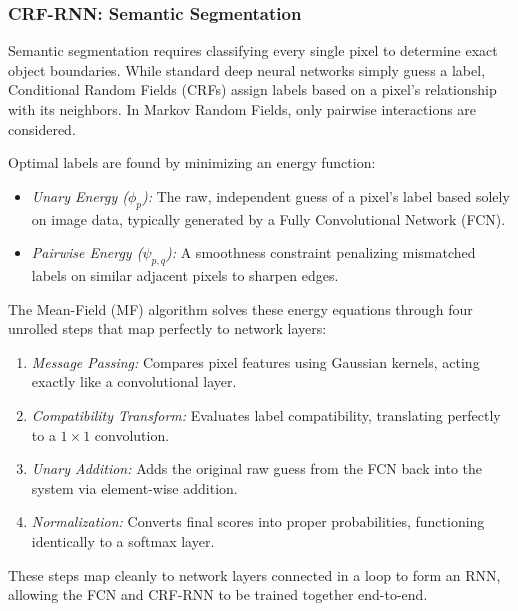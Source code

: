 \documentclass[conference]{IEEEtran}
\begin{document}
\subsubsection{CRF-RNN: Semantic Segmentation}
Semantic segmentation requires classifying every single pixel to determine exact object boundaries. While standard deep neural networks simply guess a label, Conditional Random Fields (CRFs) assign labels based on a pixel's relationship with its neighbors. In Markov Random Fields, only pairwise interactions are considered.

Optimal labels are found by minimizing an energy function:
\begin{itemize}
    \item \textit{Unary Energy ($\phi_p$):} The raw, independent guess of a pixel's label based solely on image data, typically generated by a Fully Convolutional Network (FCN).
    \item \textit{Pairwise Energy ($\psi_{p,q}$):} A smoothness constraint penalizing mismatched labels on similar adjacent pixels to sharpen edges.
\end{itemize}

The Mean-Field (MF) algorithm solves these energy equations through four unrolled steps that map perfectly to network layers:
\begin{enumerate}
    \item \textit{Message Passing:} Compares pixel features using Gaussian kernels, acting exactly like a convolutional layer.
    \item \textit{Compatibility Transform:} Evaluates label compatibility, translating perfectly to a $1 \times 1$ convolution.
    \item \textit{Unary Addition:} Adds the original raw guess from the FCN back into the system via element-wise addition.
    \item \textit{Normalization:} Converts final scores into proper probabilities, functioning identically to a softmax layer.
\end{enumerate}
These steps map cleanly to network layers connected in a loop to form an RNN, allowing the FCN and CRF-RNN to be trained together end-to-end.
\end{document}
